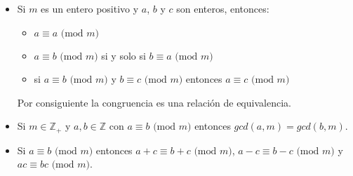 \begin{itemize}
    \item{
		 Si $m$ es un entero positivo y $a$, $b$ y $c$ son enteros, entonces:
		 \begin{itemize}			
			\item{
				$a \equiv a \text{ (mod $m$)}$	
			}
			\item{
				$a \equiv b \text{ (mod $m$)}$ si y solo si $b \equiv a \text{ (mod $m$)}$
			}
			\item{
				si $a \equiv b \text{ (mod $m$)}$ y $b \equiv c \text{ (mod $m$)}$ entonces 
				$a \equiv c \text{ (mod $m$)}$
			}
		 \end{itemize}			
		 Por consiguiente la congruencia es una relaci\'on de equivalencia.
    }
    \item{
	    Si $m \in \mathbb{Z}_{+}$ y $a, b \in \mathbb{Z}$ con	 $a \equiv b \text{ (mod $m$)}$	
		entonces $gcd(a, m) = gcd(b, m)$.
    }
    \item{
	    Si $a \equiv b \text{ (mod $m$)}$ entonces $a+c \equiv b+c \text{ (mod $m$)}$, 
	    $a-c \equiv b-c \text{ (mod $m$)}$ y $ac \equiv bc \text{ (mod $m$)}$.	
	
}
\end{itemize}
